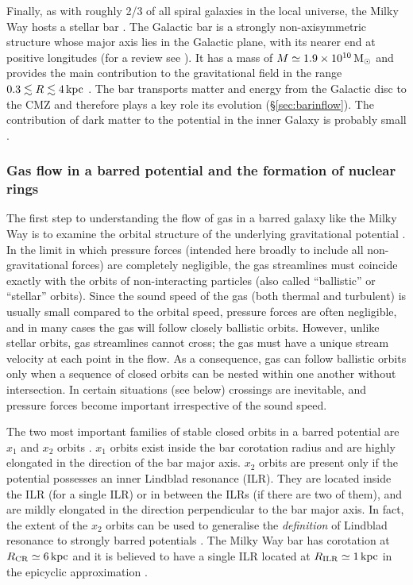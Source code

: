 Finally, as with roughly 2/3 of all spiral galaxies in the local universe, the Milky Way hosts a stellar bar \citep{Blitz1991,Wegg2013}. The Galactic bar is a strongly non-axisymmetric structure whose major axis lies in the Galactic plane, with its nearer end at positive longitudes (for a review see \citealt{Bland-Hawthorn2016}). It has a mass of $M\simeq 1.9 \times 10^{10} \, \mbox{M$_\odot$}$ and provides the main contribution to the gravitational field in the range $0.3\lesssim R \lesssim4\,\mbox{${\rm kpc}$}$ \citep{Portail2017}. The bar transports matter and energy from the Galactic disc to the CMZ and therefore plays a key role its evolution (\S\ref{sec:barinflow}). The contribution of dark matter to the potential in the inner Galaxy is probably small \citep{Portail2017,Li2020b}.

\subsubsection{Gas flow in a barred potential and the formation of nuclear rings} \label{sec:gasdynamics}

The first step to understanding the flow of gas in a barred galaxy like the Milky Way is to examine the orbital structure of the underlying gravitational potential \citep{Prendergast1983,Sellwood1993}. 
In the limit in which pressure forces (intended here broadly to include all non-gravitational forces) are completely negligible, the gas streamlines must coincide exactly with the orbits of non-interacting particles (also called ``ballistic'' or ``stellar'' orbits). Since the sound speed of the gas (both thermal and turbulent) is usually small compared to the orbital speed, pressure forces are often negligible, and in many cases the gas will follow closely ballistic orbits. 
However, unlike stellar orbits, gas streamlines cannot cross; the gas must have a unique stream velocity at each point in the flow. 
As a consequence, gas can follow ballistic orbits only when a sequence of closed orbits can be nested within one another without intersection. 
In certain situations (see below) crossings are inevitable, and pressure forces become important irrespective of the sound speed.

The two most important families of stable closed orbits in a barred potential are $x_1$ and $x_2$ orbits \citep[see Fig.~\ref{fig:sketch};][]{Contopoulos1989,Athanassoula1992a}. $x_1$ orbits exist inside the bar corotation radius and are highly elongated in the direction of the bar major axis. $x_2$ orbits are present only if the potential possesses an inner Lindblad resonance (ILR).
They are located inside the ILR (for a single ILR) or in between the ILRs (if there are two of them), and are mildly elongated in the direction perpendicular to the bar major axis. In fact, the extent of the $x_2$ orbits can be used to generalise the \emph{definition} of Lindblad resonance to strongly barred potentials \citep{VanAlbada1982}. The Milky Way bar has corotation at $R_{\rm CR}\simeq6\,\mbox{${\rm kpc}$}$ and it is believed to have a single ILR located at $R_{\rm ILR}\simeq1\,\mbox{${\rm kpc}$}$ in the epicyclic approximation \citep{Sormani2015a,Portail2017}.

